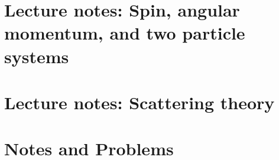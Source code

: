 \part{Lecture notes: Spin, angular momentum, and two particle systems}
   
   
   
   
   
   
   
   
   
   

\part{Lecture notes: Scattering theory}
   
   
   
   
   

\part{Notes and Problems}
   
   
   
   
   
   
   
   
   
   
   
   
   
   
   
   
